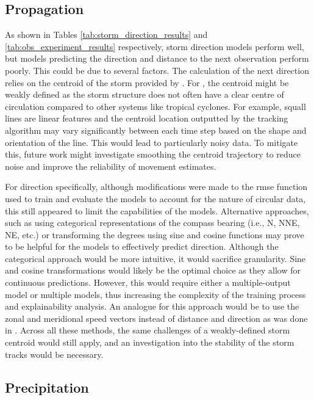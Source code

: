 \subsection{Propagation}
\label{sec:results-propagation}

As shown in Tables \ref{tab:storm_direction_results} and \ref{tab:obs_experiment_results} respectively, storm direction models perform well, but models predicting the direction and distance to the next observation perform poorly. This could be due to several factors. The calculation of the next direction relies on the centroid of the storm provided by \cite{Hill2023}. For , the centroid might be weakly defined as the storm structure does not often have a clear centre of circulation compared to other systems like tropical cyclones. For example, squall lines are linear features and the centroid location outputted by the tracking algorithm may vary significantly between each time step based on the shape and orientation of the line. This would lead to particularly noisy data. To mitigate this, future work might investigate smoothing the centroid trajectory to reduce noise and improve the reliability of movement estimates.

For direction specifically, although modifications were made to the \acrshort{rmse} function used to train and evaluate the models to account for the nature of circular data, this still appeared to limit the capabilities of the models. Alternative approaches, such as using categorical representations of the compass bearing (i.e., N, NNE, NE, etc.) or transforming the degrees using sine and cosine functions may prove to be helpful for the models to effectively predict direction. Although the categorical approach would be more intuitive, it would sacrifice granularity. Sine and cosine transformations would likely be the optimal choice as they allow for continuous predictions. However, this would require either a multiple-output model or multiple models, thus increasing the complexity of the training process and explainability analysis. An analogue for this approach would be to use the zonal and meridional speed vectors instead of distance and direction as was done in \cite{Hunt2024}. Across all these methods, the same challenges of a weakly-defined storm centroid would still apply, and an investigation into the stability of the storm tracks would be necessary.

\clearpage
\subsection{Precipitation}

